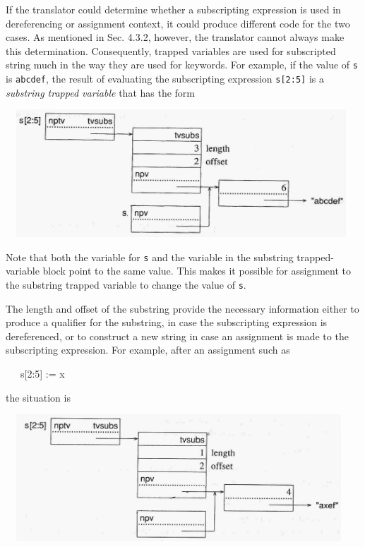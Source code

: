 If the translator could determine whether a subscripting expression is
used in dereferencing or assignment context, it could produce
different code for the two cases. As mentioned in Sec. 4.3.2, however,
the translator cannot always make this determination. Consequently,
trapped variables are used for subscripted string much in the way they
are used for keywords. For example, if the value of \texttt{s} is
\texttt{{\textquotedbl}abcdef{\textquotedbl}}, the result of
evaluating the subscripting expression \texttt{s[2:5]} is a
\textit{substring trapped variable} that has the form


\ \  \includegraphics[width=4.9161in,height=1.8835in]{ib-img/ib-img024.jpg} 


Note that both the variable for \texttt{s} and the variable in the
substring trapped-variable block point to the same value. This makes
it possible for assignment to the substring trapped variable to change
the value of \texttt{s}.

The length and offset of the substring provide the necessary
information either to produce a qualifier for the substring, in case
the subscripting expression is dereferenced, or to construct a new
string in case an assignment is made to the subscripting
expression. For example, after an assignment such as

{\ttfamily\mdseries
\ \ \ s[2:5] := {\textquotedbl}x{\textquotedbl}}

\noindent the situation is

\ \  \includegraphics[width=4.8098in,height=1.8693in]{ib-img/ib-img025.jpg} 

